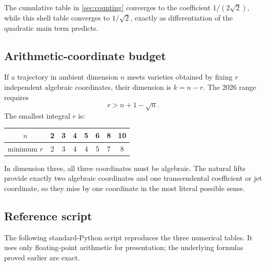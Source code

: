 \documentclass[10pt,oneside]{article}
\theoremstyle{definition}
\theoremstyle{remark}
\begin{document}
The cumulative table in \cref{sec:counting} converges to the coefficient \(1/(2\sqrt2)\), while this shell table converges to \(1/\sqrt2\), exactly as differentiation of the quadratic main term predicts.

\subsection{Arithmetic-coordinate budget}
If a trajectory in ambient dimension \(n\) meets varieties obtained by fixing \(r\) independent algebraic coordinates, their dimension is \(k=n-r\).  The 2026 range requires
\[
 r>n+1-\sqrt n.
\]
The smallest integral \(r\) is:

\begin{center}
\begin{tabular}{c c c c c c c c}
\toprule
\(n\) & 2 & 3 & 4 & 5 & 6 & 8 & 10 \\
\midrule
minimum \(r\) & 2 & 3 & 4 & 4 & 5 & 7 & 8 \\
\bottomrule
\end{tabular}
\end{center}

In dimension three, all three coordinates must be algebraic.  The natural lifts provide exactly two algebraic coordinates and one transcendental coefficient or jet coordinate, so they miss by one coordinate in the most literal possible sense.

\subsection{Reference script}
The following standard-Python script reproduces the three numerical tables.  It uses only floating-point arithmetic for presentation; the underlying formulas proved earlier are exact.
\end{document}
